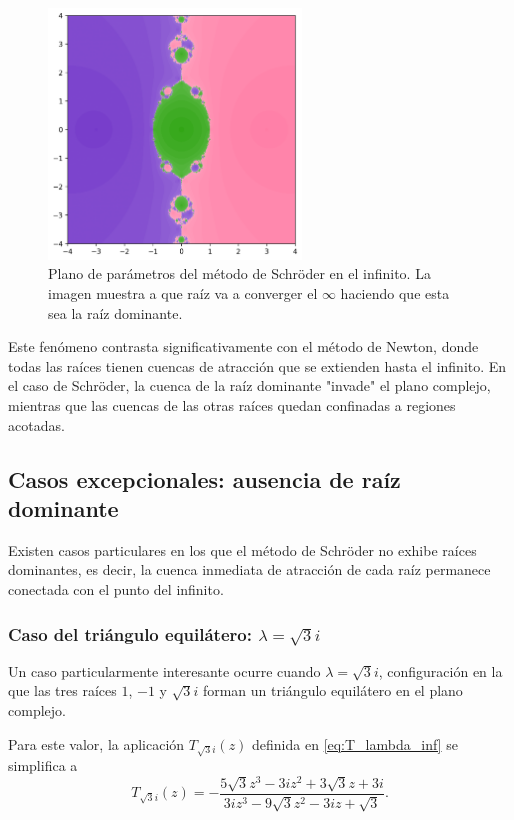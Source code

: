 \begin{figure}[H]
\centering 
\includegraphics[width=0.6\textwidth]{img/sch_infi_speed_plane_n1.png}
\caption{Plano de parámetros del método de Schröder en el infinito. La imagen muestra a que raíz va a converger el $\infty$ haciendo que esta sea la raíz dominante.}
\label{fig:sch_infi_speed_plane_n1}
\end{figure}

Este fenómeno contrasta significativamente con el método de Newton, donde todas las raíces tienen cuencas de atracción que se extienden hasta el infinito. En el caso de Schröder, la cuenca de la raíz dominante "invade" el plano complejo, mientras que las cuencas de las otras raíces quedan confinadas a regiones acotadas.

\subsection{Casos excepcionales: ausencia de raíz dominante}

Existen casos particulares en los que el método de Schröder no exhibe raíces dominantes, es decir, la cuenca inmediata de atracción de cada raíz permanece conectada con el punto del infinito.

\subsubsection{Caso del triángulo equilátero: $\lambda=\sqrt{3}i$}

Un caso particularmente interesante ocurre cuando $\lambda=\sqrt{3}i$, configuración en la que las tres raíces $1$, $-1$ y $\sqrt{3}i$ forman un triángulo equilátero en el plano complejo.

Para este valor, la aplicación $T_{\sqrt{3}i}(z)$ definida en \eqref{eq:T_lambda_inf} se simplifica a
$$
T_{\sqrt{3}i}(z)=-\frac{5\sqrt{3}z^3-3iz^2+3\sqrt{3}z+3i}{3iz^3-9\sqrt{3}z^2-3iz+\sqrt{3}}.
$$

